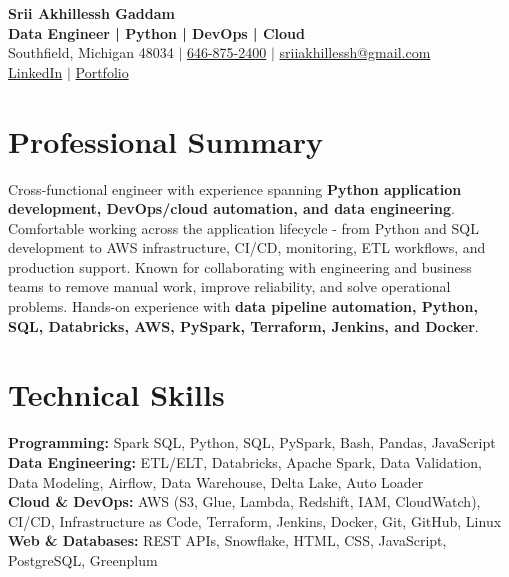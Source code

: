 \documentclass[letterpaper,10pt]{article}
\begin{document}
\fontsize{9.35pt}{10.45pt}\selectfont

\begin{center}
    {\LARGE \textbf{Srii Akhillessh Gaddam}} \\[-1pt]
    \textbf{Data Engineer | Python | DevOps | Cloud} \\[2pt]
    Southfield, Michigan 48034 $|$
    \href{tel:6468752400}{646-875-2400} $|$
    \href{mailto:sriiakhillessh@gmail.com}{sriiakhillessh@gmail.com} \\[1pt]
    \href{https://www.linkedin.com/in/srii-akhiilessh-gaddam-b48668191/}{LinkedIn} $|$
    \href{https://sriiakhillesshg.github.io/portfolio/}{Portfolio}
\end{center}
\vspace{-8pt}

\section{Professional Summary}
\small{Cross-functional engineer with experience spanning \textbf{Python application development, DevOps/cloud automation, and data engineering}. Comfortable working across the application lifecycle - from Python and SQL development to AWS infrastructure, CI/CD, monitoring, ETL workflows, and production support. Known for collaborating with engineering and business teams to remove manual work, improve reliability, and solve operational problems. Hands-on experience with \textbf{data pipeline automation, Python, SQL, Databricks, AWS, PySpark, Terraform, Jenkins, and Docker}.}

\section{Technical Skills}
\small{
\textbf{Programming:} Spark SQL, Python, SQL, PySpark, Bash, Pandas, JavaScript \\
\textbf{Data Engineering:} ETL/ELT, Databricks, Apache Spark, Data Validation, Data Modeling, Airflow, Data Warehouse, Delta Lake, Auto Loader \\
\textbf{Cloud \& DevOps:} AWS (S3, Glue, Lambda, Redshift, IAM, CloudWatch), CI/CD, Infrastructure as Code, Terraform, Jenkins, Docker, Git, GitHub, Linux \\
\textbf{Web \& Databases:} REST APIs, Snowflake, HTML, CSS, JavaScript, PostgreSQL, Greenplum
}
\end{document}
